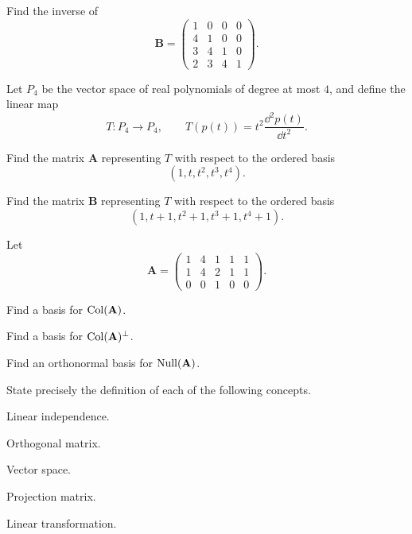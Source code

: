 \documentclass[11pt,oneside]{article}
\begin{document}
\begin{problem}
Find the inverse of
\[
\mathbf B=
\begin{pmatrix}
1&0&0&0\\
4&1&0&0\\
3&4&1&0\\
2&3&4&1
\end{pmatrix}.
\]
\end{problem}

\begin{problem}
Let $P_4$ be the vector space of real polynomials of degree at most $4$, and define the linear map
\[
T\colon P_4\to P_4,
\qquad
T(p(t))=t^2\frac{\dd^2p(t)}{\dd t^2}.
\]
\begin{problemsubparts}
\item Find the matrix $\mathbf A$ representing $T$ with respect to the ordered basis
\[
(1,t,t^2,t^3,t^4).
\]
\item Find the matrix $\mathbf B$ representing $T$ with respect to the ordered basis
\[
(1,t+1,t^2+1,t^3+1,t^4+1).
\]
\end{problemsubparts}
\end{problem}

\begin{problem}
Let
\[
\mathbf A=
\begin{pmatrix}
1&4&1&1&1\\
1&4&2&1&1\\
0&0&1&0&0
\end{pmatrix}.
\]
\begin{problemsubparts}
\item Find a basis for $\operatorname{Col}(\mathbf A)$.
\item Find a basis for $\operatorname{Col}(\mathbf A)^\perp$.
\item Find an orthonormal basis for $\operatorname{Null}(\mathbf A)$.
\end{problemsubparts}
\end{problem}

\begin{problem}
State precisely the definition of each of the following concepts.
\begin{problemchoices}
\item Linear independence.
\item Orthogonal matrix.
\item Vector space.
\item Projection matrix.
\item Linear transformation.
\end{problemchoices}
\end{problem}
\end{document}
